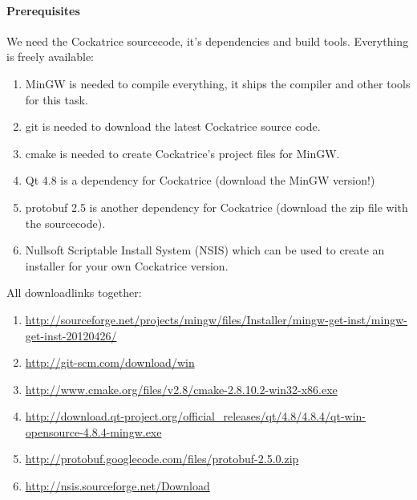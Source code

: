 \documentclass[a4paper]{scrbook}
\begin{document}
\paragraph{Prerequisites}
We need the Cockatrice sourcecode, it's dependencies and build tools. Everything is freely available:
\begin{enumerate}
 \item MinGW is needed to compile everything, it ships the compiler and other tools for this task.
 \item git is needed to download the latest Cockatrice source code.
 \item cmake is needed to create Cockatrice's project files for MinGW.
 \item Qt 4.8 is a dependency for Cockatrice (download the MinGW version!)
 \item protobuf 2.5 is another dependency for Cockatrice (download the zip file with the sourcecode).
 \item Nullsoft Scriptable Install System (NSIS) which can be used to create an installer for your own Cockatrice version.
\end{enumerate}

All downloadlinks together:
\footnotesize{\begin{enumerate}
 \item \url{http://sourceforge.net/projects/mingw/files/Installer/mingw-get-inst/mingw-get-inst-20120426/}
 \item \url{http://git-scm.com/download/win}
 \item \url{http://www.cmake.org/files/v2.8/cmake-2.8.10.2-win32-x86.exe}
 \item \url{http://download.qt-project.org/official_releases/qt/4.8/4.8.4/qt-win-opensource-4.8.4-mingw.exe}
 \item \url{http://protobuf.googlecode.com/files/protobuf-2.5.0.zip}
 \item \url{http://nsis.sourceforge.net/Download}
\end{enumerate}}
\end{document}
